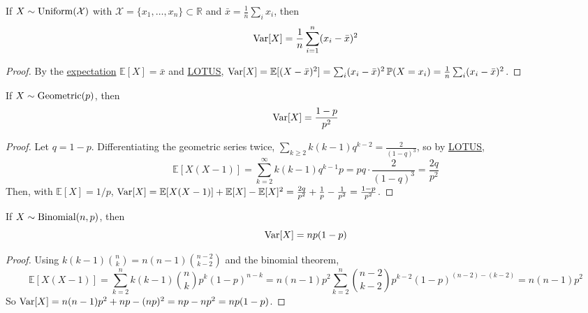   \begin{theorem}
    \label{thm:variance-of-discrete-uniform}
    If \hyperref[def:uniform-random-variable]{$X \sim \operatorname{Uniform}(\mathcal{X})$} with $\mathcal{X} = \{x_1, \ldots, x_n\} \subset \mathbb{R}$ and $\bar{x} = \frac{1}{n} \sum_i x_i$, then 
    \begin{equation}
      \operatorname{Var}[X] = \frac{1}{n} \sum_{i=1}^n (x_i - \bar{x})^2
    \end{equation}
  \end{theorem}
  \begin{proof}
    By the \hyperref[thm:expectation-of-discrete-uniform]{expectation} $\mathbb{E}[X] = \bar{x}$ and \hyperref[thm:lotus]{LOTUS}, $\operatorname{Var}[X] = \mathbb{E}[(X - \bar{x})^2] = \sum_{i} (x_i - \bar{x})^2 \, \mathbb{P}(X = x_i) = \frac{1}{n} \sum_i (x_i - \bar{x})^2$. 
  \end{proof}

  \begin{theorem}
    \label{thm:variance-of-geometric}
    If \hyperref[def:geometric-random-variable]{$X \sim \operatorname{Geometric}(p)$}, then 
    \begin{equation}
      \operatorname{Var}[X] = \frac{1 - p}{p^2}
    \end{equation}
  \end{theorem}
  \begin{proof}
    Let $q = 1 - p$. Differentiating the geometric series twice, $\sum_{k \geq 2} k(k-1) q^{k-2} = \frac{2}{(1 - q)^3}$, so by \hyperref[thm:lotus]{LOTUS}, 
    \begin{equation}
      \mathbb{E}[X(X-1)] = \sum_{k=2}^\infty k (k-1) q^{k-1} p = p q \cdot \frac{2}{(1-q)^3} = \frac{2q}{p^2}
    \end{equation}
    Then, with $\mathbb{E}[X] = 1/p$, $\operatorname{Var}[X] = \mathbb{E}[X(X-1)] + \mathbb{E}[X] - \mathbb{E}[X]^2 = \frac{2q}{p^2} + \frac{1}{p} - \frac{1}{p^2} = \frac{1-p}{p^2}$. 
  \end{proof}

  \begin{theorem}
    \label{thm:variance-of-binomial}
    If \hyperref[def:binomial-random-variable]{$X \sim \operatorname{Binomial}(n, p)$}, then 
    \begin{equation}
      \operatorname{Var}[X] = np(1 - p)
    \end{equation}
  \end{theorem}
  \begin{proof}
    Using $k(k-1) \binom{n}{k} = n(n-1) \binom{n-2}{k-2}$ and the binomial theorem, 
    \begin{equation}
      \mathbb{E}[X(X-1)] = \sum_{k=2}^n k(k-1) \binom{n}{k} p^k (1-p)^{n-k} = n(n-1) p^2 \sum_{k=2}^n \binom{n-2}{k-2} p^{k-2} (1-p)^{(n-2)-(k-2)} = n(n-1)p^2
    \end{equation}
    So $\operatorname{Var}[X] = n(n-1)p^2 + np - (np)^2 = np - np^2 = np(1-p)$. 
  \end{proof}

